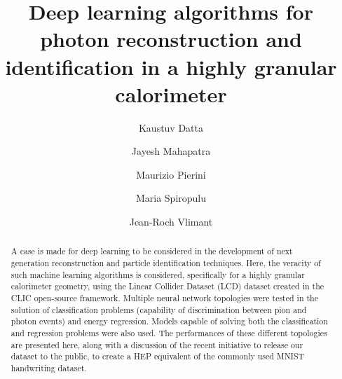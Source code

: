 \documentclass[twocolumn,aps,prd,reprint,superscriptaddress]{revtex4-1}
\begin{document}
	\graphicspath{{KaustuvDatta/}}
	
	\title{Deep learning algorithms for photon reconstruction and identification in a highly granular calorimeter}
	\author{Kaustuv Datta}
	
	\author{Jayesh Mahapatra}
	
	\author{Maurizio Pierini}
	
	\author{Maria Spiropulu}
	
	\author{Jean-Roch Vlimant}

	
	\begin{abstract}
		A case is made for deep learning to be considered in the development of next generation reconstruction and particle identification techniques. Here, the veracity of such machine learning algorithms is considered, specifically for a highly granular calorimeter geometry, using the Linear Collider Dataset (LCD) dataset created in the CLIC open-source framework. Multiple neural network topologies were tested in the solution of classification problems (capability of discrimination between pion and photon events) and energy regression. Models capable of solving both the classification and regression problems were also used. The performances of these different topologies are presented here, along with a discussion of the recent initiative to release our dataset to the public, to create a HEP equivalent of the commonly used MNIST handwriting dataset. 
	\end{abstract}
	\maketitle
	
	
\end{document}
